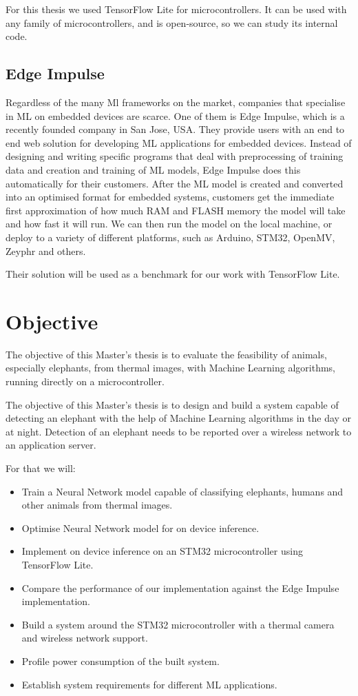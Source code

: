 For this thesis we used TensorFlow Lite for microcontrollers.
It can be used with any family of microcontrollers, and is open-source, so we can study its internal code.


\subsection{ Edge Impulse}

Regardless of the many Ml frameworks on the market, companies that specialise in ML on embedded devices are scarce.
One of them is Edge Impulse, which is a recently founded company in San Jose, USA.
They provide users with an end to end web solution for developing ML applications for embedded devices.
Instead of designing and writing specific programs that deal with preprocessing of training data and creation and training of ML models, Edge Impulse does this automatically for their customers.
After the ML model is created and converted into an optimised format for embedded systems, customers get the immediate first approximation of how much RAM and FLASH memory the model will take and how fast it will run.
We can then run the model on the local machine, or deploy to a variety of different platforms, such as Arduino, STM32, OpenMV, Zeyphr and others.

Their solution will be used as a benchmark for our work with TensorFlow Lite.


\section{ Objective}\label{objective}

The objective of this Master's thesis is to evaluate the feasibility of  animals, especially elephants, from thermal images, with Machine Learning algorithms, running directly on a microcontroller.

The objective of this Master's thesis is to design and build a system capable of detecting an elephant with the help of Machine Learning algorithms in the day or at night.
Detection of an elephant needs to be reported over a wireless network to an application server.

For that we will:

\begin{itemize}
    \item Train a Neural Network model capable of classifying elephants, humans and other animals from thermal images.
    \item Optimise Neural Network model for on device inference.
    \item Implement on device inference on an STM32 microcontroller using TensorFlow Lite.
    \item Compare the performance of our implementation against the Edge Impulse implementation.
    \item Build a system around the STM32 microcontroller with a thermal camera and wireless network support.
    \item Profile power consumption of the built system.
    \item Establish system requirements for different ML applications.
\end{itemize}


